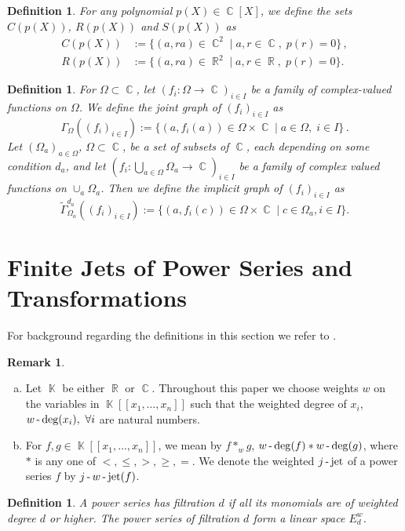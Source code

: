 \documentclass[noend]{amsproc}
\newtheorem{defn}[theorem]{Definition}
\theoremstyle{definition}
\newtheorem{remark}[theorem]{Remark}
\DeclareMathOperator{\R}{\mathbb{R}}
\DeclareMathOperator{\C}{\mathbb{C}}
\DeclareMathOperator{\K}{\mathbb{K}}
\DeclareMathOperator{\dash}{\textnormal{-}}
\DeclareMathOperator{\jet}{jet}
\begin{document}
\begin{defn}
For any polynomial $p(X) \in \C[X]$, we define the sets $C(p(X))$, $R(p(X))$ and $S(p(X))$
as
\begin{align*}
C(p(X)) &:= \{ (a, ra) \in \C^2 \mid a, r \in \C, \; p(r) = 0 \} \,, \\
R(p(X)) &:= \{ (a, ra) \in \R^2 \mid a, r \in \R, \; p(r) = 0 \}.
\end{align*}
\end{defn}

\begin{defn}
For $\Omega \subset \C$, let $(f_i: \Omega \rightarrow \C)_{i \in I}$ be a
family of complex-valued functions on $\Omega$. We define the joint graph of
$(f_i)_{i \in I}$ as
\[
\Gamma_\Omega((f_i)_{i \in I})
:= \{ (a, f_i(a)) \in \Omega \times \C \mid a\in \Omega,\; i \in I \}\,.
\]
Let $(\Omega_a)_{a\in\Omega}$, $\Omega\subset\C$, be a set of subsets of $\C$, each depending on some condition $d_a$, and let $(f_i:\bigcup_{a\in\Omega}\Omega_{a}\to\C)_{i\in I}$ be a family of complex valued functions on $\cup_a\Omega_{a}$. Then we define the implicit graph of $(f_i)_{i\in I}$ as
\[ \widetilde\Gamma_{\Omega_a}^{d_a}((f_i)_{i\in I}):=\{(a, f_i(c))\in\Omega\times\C\mid c\in\Omega_a, i\in I\}.\]
\end{defn}

\section{Finite Jets of Power Series and Transformations}

For background regarding the definitions in this section we refer to \cite{A1975}.

\begin{remark}
\phantom{X}\hfill
\begin{enumerate}[(a)]
\item Let $\K$ be either $\R$ or $\C$. Throughout this paper we choose weights $w$ on the variables in $\K[[x_1,\ldots,x_n]]$ such that the weighted degree of $x_i$, $w\dash\deg(x_i),\ \forall i$ are natural numbers. 
\item For $f,g\in\K[[x_1,\ldots,x_n]]$, we mean by $f*_wg$, $w\dash\deg(f)* w\dash\deg(g)$, where $*$ is any one of $<,\le,>,\ge,=$. We denote the weighted $j\dash\jet$ of a power series $f$ by $j\dash w\dash\jet(f)$.
\end{enumerate}
\end{remark}

\begin{defn}
A power series has filtration $d$ if all its monomials are of weighted degree $d$ or higher. The power series of filtration $d$ form a linear space $E_d^w$.
\end{defn}
\end{document}
